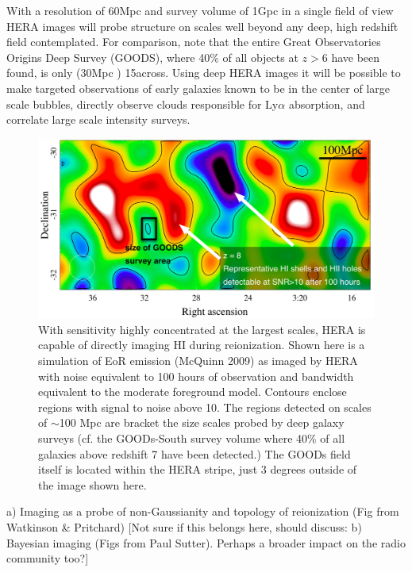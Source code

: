 \documentclass[preprint]{aastex}
\begin{document}
With a resolution of 60Mpc and survey volume of 1Gpc in a single field of view HERA images will probe structure on scales well beyond any deep, high redshift field contemplated. For comparison, note that the entire Great Observatories Origins Deep Survey (GOODS), where 40\% of all objects at $z > 6$ have been found, is only (30Mpc ) 15\arcmin  across. Using deep HERA images it will be possible to make targeted observations of early galaxies known to be in the center of large scale bubbles, directly observe clouds responsible for Ly$\alpha$ absorption, and correlate large scale intensity surveys.


 
\begin{figure}[t]\centering
\includegraphics[width=\textwidth]{plots/Imaging/HERA_331_z8_SNR_annotated.jpg}
\caption{\small
With sensitivity highly concentrated at the largest scales, HERA is capable of directly imaging HI during reionization.  Shown here is a simulation of EoR emission (McQuinn 2009) as imaged by HERA with noise equivalent to 100 hours of observation and bandwidth equivalent to the moderate foreground model. %
Contours enclose regions with signal to noise above 10.  The regions detected on scales of $\sim$100 Mpc are bracket the size scales probed by deep galaxy surveys (cf. the GOODs-South survey volume where 40\% of all galaxies above redshift 7 have been detected.)  The GOODs field itself is located within the HERA stripe, just 3 degrees outside of the image shown here.
\label{fig:imaging}}
\end{figure}    
a) Imaging as a probe of non-Gaussianity and topology of reionization (Fig from Watkinson \& Pritchard)
[Not sure if this belongs here, should discuss: b) Bayesian imaging (Figs from Paul Sutter).  
Perhaps a broader impact on the radio community too?]
\end{document}
